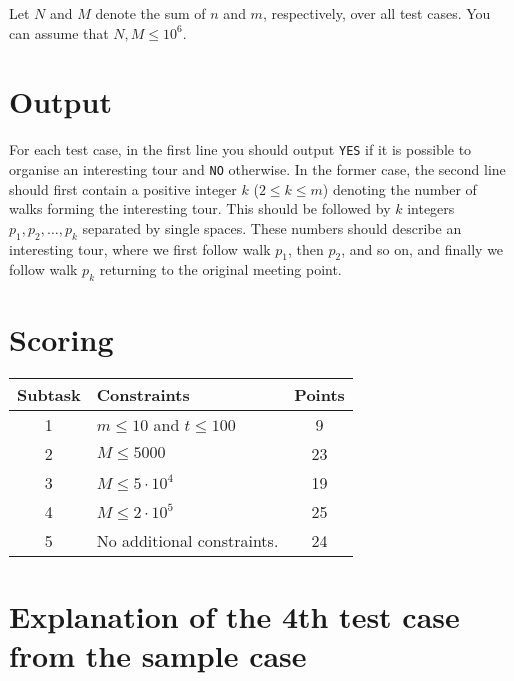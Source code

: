 Let $N$ and $M$ denote the sum of $n$ and $m$, respectively, over all test cases. You can assume that $N, M \leq 10^{6}$.

\section*{Output}
For each test case, in the first line you should output \texttt{YES} if it is possible to organise an interesting tour
and \texttt{NO} otherwise. In the former case, the second line should first contain a positive integer $k$ ($2\leq k\leq m$) denoting
the number of walks forming the interesting tour. This should be followed by $k$ integers
$p_{1}, p_{2}, \ldots, p_{k}$
separated by single spaces. These numbers should describe an interesting tour, where we first follow walk
$p_{1}$, then $p_{2}$, and so on, and finally we follow walk $p_{k}$ returning to the original meeting point.

\section*{Scoring}
\begin{center}
\begin{tabular}{|c|p{13cm}|c|}
\hline
\textbf{Subtask} & \textbf{Constraints} & \textbf{Points} \\\hline
1 & $m \leq 10$ and $t \leq 100$ & 9 \\\hline
2 & $M \leq 5000$ & 23 \\\hline
3 & $M \leq 5 \cdot 10^{4}$ & 19 \\\hline
4 & $M \leq 2 \cdot 10^{5}$ & 25 \\\hline
5 & No additional constraints. & 24 \\\hline
\end{tabular}
\end{center}

\section*{Explanation of the 4th test case from the sample case}
\begin{figure}[h!]
\centering
{}
\end{figure}
